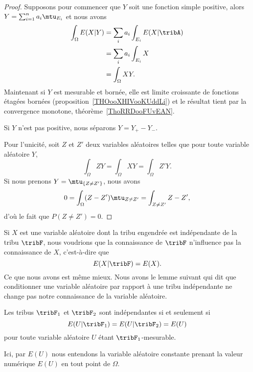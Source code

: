 \begin{proof}
	Supposons pour commencer que \( Y\) soit une fonction simple positive, alors \( Y=\sum_{i=1}^na_i\mtu_{E_i}\) et nous avons
	\begin{subequations}
		\begin{align}
			\int_{\Omega}E(X|Y) & =\sum_{i}a_i\int_{E_i}E(X|\tribA) \\
			                    & =\sum_ia_i\int_{E_i}X             \\
			                    & =\int_{\Omega}XY.
		\end{align}
	\end{subequations}
	Maintenant si \( Y\) est mesurable et bornée, elle est limite croissante de fonctions étagées bornées (proposition~\ref{THOooXHIVooKUddLi}) et le résultat tient par la convergence monotone, théorème~\ref{ThoRRDooFUvEAN}.

	Si \( Y\) n'est pas positive, nous séparons \( Y=Y_+-Y_-\).

	Pour l'unicité, soit \( Z\) et \( Z'\) deux variables aléatoires telles que pour toute variable aléatoire \( Y\),
	\begin{equation}
		\int_{\Omega}ZY=\int_{\Omega}XY=\int_{\Omega}Z'Y.
	\end{equation}
	Si nous prenons \( Y=\mtu_{\{ Z\neq Z' \}}\), nous avons
	\begin{equation}
		0=\int_{\Omega}(Z-Z')\mtu_{Z\neq Z'}=\int_{Z\neq Z'}Z-Z',
	\end{equation}
	d'où le fait que \( P(Z\neq Z')=0\).
\end{proof}

Si \( X\) est une variable aléatoire dont la tribu engendrée est indépendante de la tribu \( \tribF\), nous voudrions que la connaissance de \( \tribF\) n'influence pas la connaissance de \( X\), c'est-à-dire que
\begin{equation}
	E(X|\tribF)=E(X).
\end{equation}
Ce que nous avons est même mieux. Nous avons le lemme suivant qui dit que conditionner une variable aléatoire par rapport à une tribu indépendante ne change pas notre connaissance de la variable aléatoire.
\begin{lemma}     \label{LemxUZFPV}
	Les tribus \( \tribF_1\) et \( \tribF_2\) sont indépendantes si et seulement si
	\begin{equation}
		E(U|\tribF_1)=E(U|\tribF_2)=E(U)
	\end{equation}
	pour toute variable aléatoire \( U\) étant \( \tribF_1\)-mesurable.
\end{lemma}
Ici, par \( E(U)\) nous entendons la variable aléatoire constante prenant la valeur numérique \( E(U)\) en tout point de \( \Omega\).

